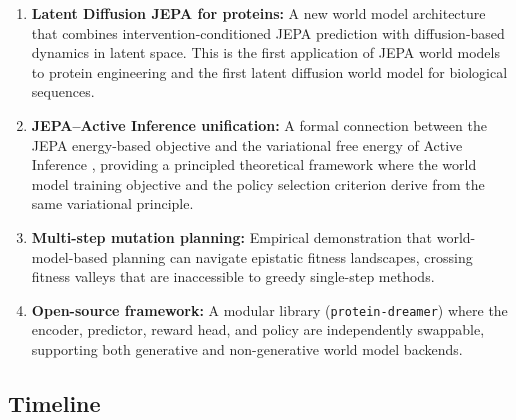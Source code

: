 \documentclass[12pt, a4paper]{article}
\begin{document}
\begin{enumerate}
    \item \textbf{Latent Diffusion JEPA for proteins:} A new world model architecture that combines intervention-conditioned JEPA prediction \citep{nam2026causaljepa, maes2026leworldmodel} with diffusion-based dynamics \citep{ho2020ddpm, rombach2022ldm} in latent space. This is the first application of JEPA world models to protein engineering and the first latent diffusion world model for biological sequences.

    \item \textbf{JEPA--Active Inference unification:} A formal connection between the JEPA energy-based objective \citep{lecun2022path} and the variational free energy of Active Inference \citep{parr2022active}, providing a principled theoretical framework where the world model training objective and the policy selection criterion derive from the same variational principle.

    \item \textbf{Multi-step mutation planning:} Empirical demonstration that world-model-based planning can navigate epistatic fitness landscapes, crossing fitness valleys that are inaccessible to greedy single-step methods.

    \item \textbf{Open-source framework:} A modular library (\texttt{protein-dreamer}) where the encoder, predictor, reward head, and policy are independently swappable, supporting both generative and non-generative world model backends.
\end{enumerate}

\subsection{Timeline}
\end{document}
